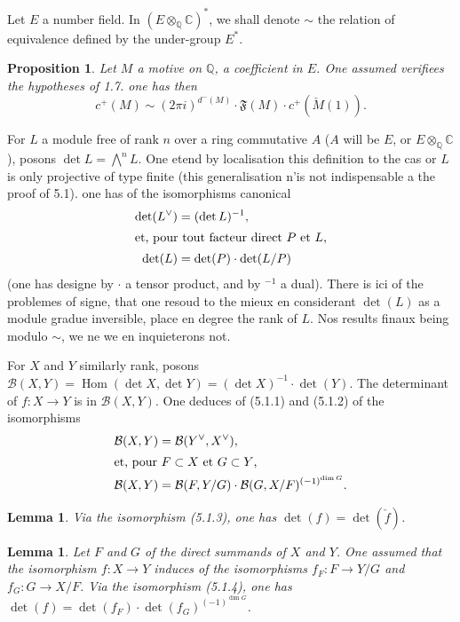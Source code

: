 \documentclass[12pt,a4paper]{article}
\theoremstyle{plain}
\newtheorem{lemma}[theorem]{Lemma}
\newtheorem{proposition}[theorem]{Proposition}
\theoremstyle{definition}
\theoremstyle{remark}
\DeclareMathOperator{\Hom}{Hom}
\newcommand{\Q}{\mathbb{Q}}
\newcommand{\C}{\mathbb{C}}
\begin{document}
Let $E$ a number field. In $(E \otimes_\Q \C)^*$, we shall denote $\sim$ the relation
of equivalence defined by the under-group $E^*$.

\begin{proposition}\label{prop:5.1}
Let $M$ a motive on $\Q$, a coefficient in $E$. One assumed verifiees the hypotheses
of 1.7. one has then
\[
c^+(M) \sim (2\pi i)^{d^-(M)} \cdot \mathfrak{F}(M) \cdot c^+(\check{M}(1)).
\]
\end{proposition}

For $L$ a module free of rank $n$ over a ring commutative $A$ ($A$ will be $E$, or
$E \otimes_\Q \C$), posons $\det L = \bigwedge^n L$. One etend by localisation this definition to the cas or
$L$ is only projective of type finite (this generalisation n'is not indispensable a the
proof of 5.1). one has of the isomorphisms canonical
\begin{align}
\det(L^\vee) &= (\det L)^{-1}, \label{eq:5.1.1}\\
\intertext{et, pour tout facteur direct $P$ et $L$,}
\det(L) &= \det(P) \cdot \det(L/P) \label{eq:5.1.2}
\end{align}
(one has designe by $\cdot$ a tensor product, and by $^{-1}$ a dual). There is ici of the problemes
of signe, that one resoud to the mieux en considerant $\det(L)$ as a module gradue
inversible, place en degree the rank of $L$. Nos results finaux being modulo $\sim$, we
ne we en inquieterons not.

For $X$ and $Y$ similarly rank, posons $\mathcal{B}(X, Y) = \Hom(\det X, \det Y) =
(\det X)^{-1} \cdot \det(Y)$. The determinant of $f: X \to Y$ is in $\mathcal{B}(X, Y)$. One deduces of (5.1.1)
and (5.1.2) of the isomorphisms
\begin{align}
\mathcal{B}(X, Y) &= \mathcal{B}(Y^\vee, X^\vee), \label{eq:5.1.3}\\
\intertext{et, pour $F \subset X$ et $G \subset Y$,}
\mathcal{B}(X, Y) &= \mathcal{B}(F, Y/G) \cdot \mathcal{B}(G, X/F)^{(-1)^{\dim G}}. \label{eq:5.1.4}
\end{align}

\begin{lemma}\label{lem:5.1.5}
Via the isomorphism (5.1.3), one has $\det(f) = \det(\check{f})$.
\end{lemma}

\begin{lemma}\label{lem:5.1.6}
Let $F$ and $G$ of the direct summands of $X$ and $Y$. One assumed that the isomorphism
$f: X \to Y$ induces of the isomorphisms $f_F: F \to Y/G$ and $f_G: G \to X/F$. Via
the isomorphism (5.1.4), one has $\det(f) = \det(f_F) \cdot \det(f_G)^{(-1)^{\dim G}}$.
\end{lemma}
\end{document}
